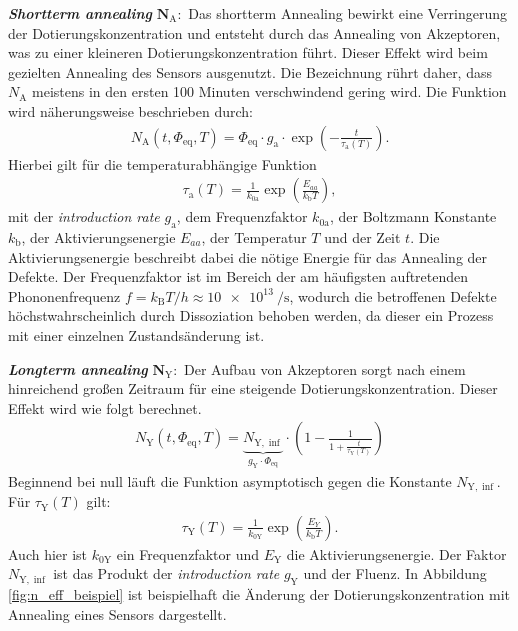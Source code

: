 \textbf{\textit{Shortterm annealing}} $\symbf{N_{\mathrm{A}}}:$ Das shortterm Annealing bewirkt eine Verringerung der Dotierungskonzentration und entsteht durch
das Annealing von Akzeptoren, was zu einer kleineren Dotierungskonzentration führt. Dieser Effekt wird beim
gezielten Annealing des Sensors ausgenutzt. Die Bezeichnung rührt daher, dass $N_{\mathrm{A}}$ meistens in den ersten 100 Minuten verschwindend gering wird. Die
Funktion wird näherungsweise beschrieben durch:
\begin{align}
  N_{\mathrm{A}}(t, \Phi_{\mathrm{eq}}, T) = \Phi_{\mathrm{eq}} \cdot g_{\mathrm{a}} \cdot \exp{\left(-\frac{t}{\tau_{\mathrm{a}}(T)}\right)}.
\end{align}
Hierbei gilt für die temperaturabhängige Funktion
\begin{align}
  \tau_{\mathrm{a}}(T) = \frac{1}{k_{0\mathrm{a}}}\exp{\left(\frac{E_{aa}}{k_{\mathrm{b}}T}\right)},
\end{align}
mit der \textit{introduction rate} $g_{\mathrm{a}}$, dem Frequenzfaktor $k_{0\mathrm{a}}$, der Boltzmann Konstante $k_{\mathrm{b}}$,
der Aktivierungsenergie $E_{aa}$, der Temperatur $T$ und der Zeit $t$. Die Aktivierungsenergie beschreibt dabei die nötige Energie für das Annealing der Defekte.
Der Frequenzfaktor ist im Bereich der am häufigsten auftretenden Phononenfrequenz ${f = k_{\mathrm{B}}T/h \approx \SI{10e13}{\per\second}}$, wodurch
die betroffenen Defekte höchstwahrscheinlich durch Dissoziation behoben werden, da dieser ein Prozess mit einer einzelnen Zustandsänderung ist.


\textbf{\textit{Longterm annealing}} $\symbf{N_{\mathrm{Y}}}:$ Der Aufbau von
Akzeptoren sorgt nach einem hinreichend großen Zeitraum für eine steigende
Dotierungskonzentration. Dieser Effekt wird wie folgt berechnet.
\begin{align}
  N_{\mathrm{Y}}(t, \Phi_{\mathrm{eq}}, T)     = \underbrace{N_{\mathrm{Y , \inf}}}_{g_{\mathrm{Y}}\cdot\Phi_{\mathrm{eq}}}\cdot \left(1 - \frac{1}{1 + \frac{t}{\tau_{\mathrm{Y}}(T)}}\right)
\end{align}
Beginnend bei null läuft die Funktion asymptotisch gegen die Konstante $N_{\mathrm{Y, \inf}}$.
Für $\tau_{\mathrm{Y}}(T)$ gilt:
\begin{align}
  \tau_{\mathrm{Y}}(T) = \frac{1}{k_{0\mathrm{Y}}}\exp{\left(\frac{E_{Y}}{k_{\mathrm{b}}T}\right)}.
\end{align}
Auch hier ist $k_{0\mathrm{Y}}$ ein Frequenzfaktor und $E_{\mathrm{Y}}$ die Aktivierungsenergie. Der Faktor $N_{\mathrm{Y , \inf}}$
ist das Produkt der \textit{introduction rate} $g_{\mathrm{Y}}$ und der Fluenz.
In Abbildung \ref{fig:n_eff_beispiel} ist beispielhaft die Änderung der Dotierungskonzentration mit Annealing eines
Sensors dargestellt.


